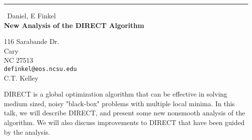 \documentclass{report}
\begin{document}
\begin{center}
\rule{6in}{1pt} \
{\large Daniel, E Finkel \\
{\bf New Analysis of the DIRECT Algorithm}}

116 Sarabande Dr. \\ Cary \\ NC 27513
\\
{\tt definkel@eos.ncsu.edu}\\
C.T. Kelley\end{center}

DIRECT is a global optimization algorithm that can be effective in
solving medium sized, noisy "black-box" problems with multiple local
minima. In this talk, we will describe DIRECT, and present some new
nonsmooth analysis of the algorithm. We will also discuss improvements to
DIRECT that have been guided by the analysis.
\end{document}
